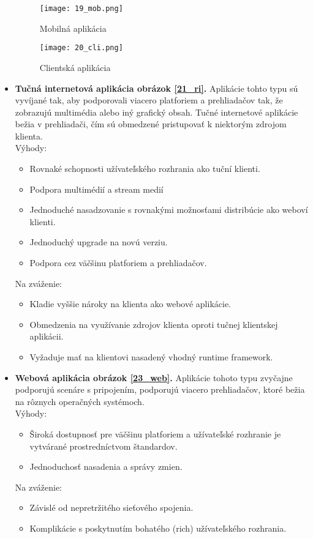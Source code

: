 \begin{itemize}
\begin{figure}[!htbp]
\centering
\texttt{[image: 19\_mob.png]}
\caption{Mobilná aplikácia \cite{IOT03}}
\label{19_mob}
\end{figure}

\begin{figure}[!htbp]
\centering
\texttt{[image: 20\_cli.png]}
\caption{Clientská aplikácia \cite{IOT03}}
\label{20_cli}
\end{figure}
 
\item
 \textbf{Tučná internetová aplikácia obrázok \ref{21_ri}.} Aplikácie tohto typu sú vyvíjané tak, aby podporovali viacero platforiem a prehliadačov tak, že zobrazujú multimédia alebo iný grafický obsah. Tučné internetové aplikácie bežia v prehliadači, čím sú obmedzené pristupovať k niektorým zdrojom klienta. \\
Výhody: 
 \begin{itemize}
   \item  Rovnaké schopnosti užívateľského rozhrania ako tuční klienti.
   \item  Podpora multimédií a stream medií
   \item  Jednoduché nasadzovanie  s rovnakými možnosťami distribúcie ako weboví klienti. 
   \item Jednoduchý upgrade na novú verziu.
   \item Podpora cez väčšinu platforiem a prehliadačov. 
 \end{itemize}
Na zváženie: 
 \begin{itemize}
   \item Kladie vyššie nároky na klienta ako webové aplikácie.
   \item Obmedzenia na využívanie zdrojov klienta oproti tučnej klientskej aplikácii. 
   \item Vyžaduje mať na klientovi nasadený vhodný runtime framework.
 \end{itemize} 
 
  \item
  \textbf{Webová aplikácia obrázok \ref{23_web}.} Aplikácie tohoto typu zvyčajne podporujú scenáre s pripojením, podporujú viacero prehliadačov, ktoré bežia na rôznych operačných systémoch.\\
Výhody: 
 \begin{itemize}
   \item Široká dostupnosť pre väčšinu platforiem a užívateľské rozhranie je vytvárané prostredníctvom štandardov.
   \item Jednoduchosť nasadenia a správy zmien.
 \end{itemize}
Na zváženie: 
 \begin{itemize}
   \item Závislé od nepretržitého sieťového spojenia.
   \item Komplikácie s poskytnutím bohatého (rich) užívateľského rozhrania.
 \end{itemize}  
 

\end{itemize}
